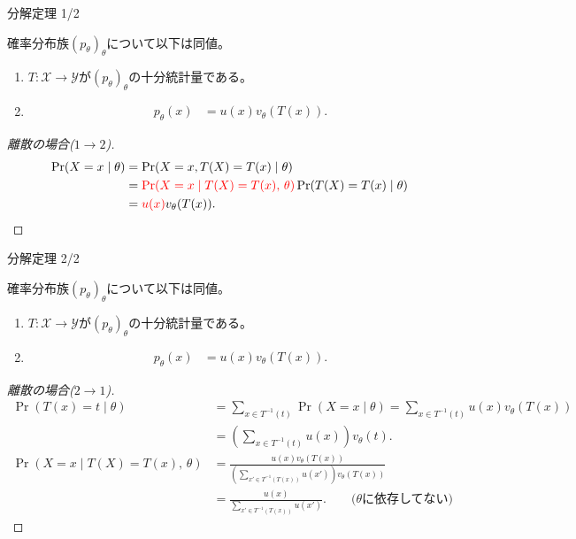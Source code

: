 \documentclass[lualatex,handout]{beamer}
\newcommand{\mycolor}[2]{%
  \begingroup
  \colorlet{currentcolor}{.}%
  \color{#1}#2%
  \color{currentcolor}%
  \endgroup
}
\newcommand{\emm}[1]{\mycolor{red}{#1}}
\theoremstyle{definition}
\begin{document}
\begin{frame}{分解定理 1/2}
\footnotesize
\begin{theorem}
確率分布族$(p_\theta)_\theta$について以下は同値。
\begin{enumerate}
\item $T\colon\mathcal{X}\to\mathcal{Y}$が$(p_\theta)_\theta$の十分統計量である。
\item 
\begin{align*}
p_\theta(x) &= u(x) v_\theta(T(x)).
\end{align*}
\end{enumerate}
\end{theorem}
\begin{proof}[\small 離散の場合($1\to 2$)]
\begin{align*}
\Pr(X=x\mid \theta) &= \Pr(X=x, T(X) = T(x)\mid \theta)\\
&= \emm{\Pr(X=x\mid T(X) = T(x),\,\theta)}\Pr(T(X)=T(x)\mid\theta)\\
&= \emm{u(x)}v_\theta(T(x)).
\end{align*}
\end{proof}
\end{frame}

\begin{frame}{分解定理 2/2}
\footnotesize
\begin{theorem}
確率分布族$(p_\theta)_\theta$について以下は同値。
\begin{enumerate}
\item $T\colon\mathcal{X}\to\mathcal{Y}$が$(p_\theta)_\theta$の十分統計量である。
\item 
\begin{align*}
p_\theta(x) &= u(x) v_\theta(T(x)).
\end{align*}
\end{enumerate}
\end{theorem}
\begin{proof}[\small 離散の場合($2\to 1$)]

\vspace{-1em}
\begin{align*}
\Pr(T(x)=t\mid\theta)&=\sum_{x\in T^{-1}(t)} \Pr(X=x\mid \theta)
=\sum_{x\in T^{-1}(t)} u(x)v_\theta(T(x))\\
&=\left(\sum_{x\in T^{-1}(t)} u(x)\right)v_\theta(t).\\
\Pr(X=x\mid T(X)=T(x),\, \theta)&=\frac{u(x)v_\theta(T(x))}{\left(\sum_{x'\in T^{-1}(T(x))} u(x')\right)v_\theta(T(x))}\\
&=\frac{u(x)}{\sum_{x'\in T^{-1}(T(x))} u(x')}. \qquad\text{($\theta$に依存してない)}
\end{align*}
\end{proof}
\end{frame}
\end{document}
